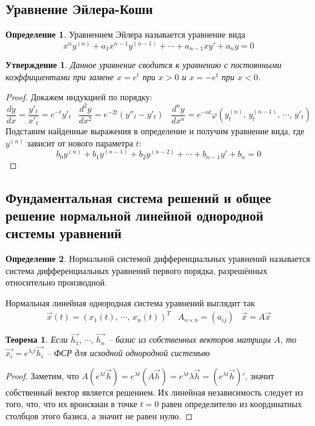 \documentclass[a4paper,12pt]{article}
\renewcommand{\phi}{\ensuremath{\varphi}}
\theoremstyle{plain}
\newtheorem{theorem}{Теорема}[section]
\newtheorem{proposition}{Утверждение}[section]
\theoremstyle{definition}
\newtheorem{definition}{Определение}[section]
\theoremstyle{remark}
\begin{document}
\subsection{Уравнение Эйлера-Коши}
\begin{definition}
	Уравнением Эйлера называется уравнение вида
	\[x^ny^{(n)} + a_1x^{n-1}y^{(n-1)} + \cdots + a_{n-1}xy' + a_ny = 0\]
\end{definition}

\begin{proposition}
	Данное уравнение сводится к уравнению с постоянными коэффициентами при замене $x = e^t$ при $x > 0$ и $x = -e^t$ при $x < 0$.
\end{proposition}

\begin{proof}
	Докажем индукцией по порядку:
	\[\frac{dy}{dx} = \frac{y'_t}{x'_t} = e^{-t}y'_t \;\;\; \frac{d^2y}{dx^2} = e^{-2t}(y''_t - y'_t)\;\;\; \frac{d^ny}{dx^n} = e^{-nt}\phi(y^{(n)}_t,\,y^{(n-1)}_t,\,\cdots,\,y'_t)\]
	Подставим найденные выражения в определение и получим уравнение вида, где $y^{(n)}$ зависит от нового параметра $t$:
	\[b_0y^{(n)} + b_1y^{(n-1)} + b_2y^{(n-2)} + \cdots + b_{n-1}y' + b_n = 0\]
\end{proof}

\subsection{Фундаментальная система решений и общее решение нормальной линейной однородной системы уравнений}
\begin{definition}
	Нормальной системой дифференциальных уравнений называется система дифференциальных уравнений первого порядка, разрешённых относительно производной.

	Нормальная линейная однородная система уравнений выглядит так
	\[\vec{x}(t) = (x_1(t),\,\cdots,\,x_n(t))^T\;\;\; A_{n \times n} = (a_{ij}) \;\;\; \dot{\vec{x}} = A\vec{x}\]
\end{definition}

\begin{theorem}
	Если $\vec{h_1},\,\cdots,\,\vec{h_n}$ -- базис из собственных векторов матрицы $A$, то $\vec{x_i} = e^{\lambda_i t}\vec{h_i}$ -- ФСР для исходной однородной системыю
\end{theorem}

\begin{proof}
	Заметим, что $A(e^{\lambda t}\vec{h}) = e^{\lambda t}(A\vec{h}) = e^{\lambda t}\lambda\vec{h} = (e^{\lambda t}\vec{h})'$, значит собственный вектор является решением. Их линейная независимость следует из того, что, что их вронскиан в точке $t = 0$ равен определителю из координатных столбцов этого базиса, а значит не равен нулю.
\end{proof}
\end{document}
